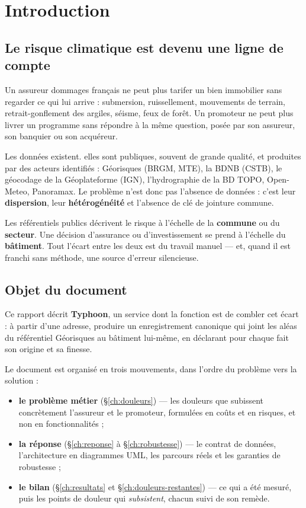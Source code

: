 \chapter{Introduction}
\label{ch:introduction}

\section{Le risque climatique est devenu une ligne de compte}

Un assureur dommages français ne peut plus tarifer un bien immobilier sans
regarder ce qui lui arrive : submersion, ruissellement, mouvements de terrain,
retrait-gonflement des argiles, séisme, feux de forêt. Un promoteur ne peut plus
livrer un programme sans répondre à la même question, posée par son assureur,
son banquier ou son acquéreur.

Les données existent. elles sont publiques, souvent de grande qualité, et
produites par des acteurs identifiés : Géorisques (BRGM, MTE), la BDNB (CSTB),
le géocodage de la Géoplateforme (IGN), l'hydrographie de la BD TOPO, Open-Meteo,
Panoramax. Le problème n'est donc pas l'absence de données : c'est leur
\textbf{dispersion}, leur \textbf{hétérogénéité} et l'absence de clé de jointure
commune.

\begin{encadre}[title={Le décalage central}]
Les référentiels publics décrivent le risque à l'échelle de la \textbf{commune}
ou du \textbf{secteur}. Une décision d'assurance ou d'investissement se prend à
l'échelle du \textbf{bâtiment}. Tout l'écart entre les deux est du travail manuel
— et, quand il est franchi sans méthode, une source d'erreur silencieuse.
\end{encadre}

\section{Objet du document}

Ce rapport décrit \textbf{Typhoon}, un service dont la fonction est de combler
cet écart : à partir d'une adresse, produire un enregistrement canonique qui
joint les aléas du référentiel Géorisques au bâtiment lui-même, en déclarant
pour chaque fait son origine et sa finesse.

Le document est organisé en trois mouvements, dans l'ordre du problème vers la
solution :

\begin{itemize}
  \item \textbf{le problème métier} (\S\ref{ch:douleurs}) — les douleurs que
    subissent concrètement l'assureur et le promoteur, formulées en coûts et en
    risques, et non en fonctionnalités ;
  \item \textbf{la réponse} (\S\ref{ch:reponse} à \S\ref{ch:robustesse}) — le
    contrat de données, l'architecture en diagrammes UML, les parcours réels et
    les garanties de robustesse ;
  \item \textbf{le bilan} (\S\ref{ch:resultats} et \S\ref{ch:douleurs-restantes})
    — ce qui a été mesuré, puis les points de douleur qui \emph{subsistent},
    chacun suivi de son remède.
\end{itemize}

